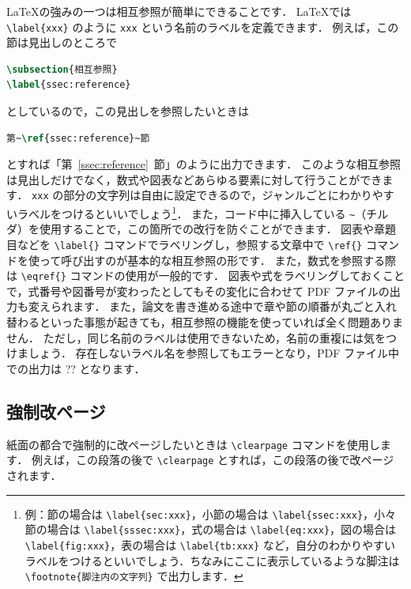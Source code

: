 \documentclass[
    paper=a4paper,      %
    article,            %
    fontsize=11pt,      %
    jafontsize=11pt,    %
    head_space=25mm,    %
    foot_space=25mm,    %
    gutter=20mm,        %
    fore-edge=20mm      %
    ]{jlreq}            %
\begin{document}
\LaTeX の強みの一つは相互参照が簡単にできることです．
\LaTeX では \verb|\label{xxx}| のように \verb|xxx| という名前のラベルを定義できます．
例えば，この節は見出しのところで
\begin{lstlisting}[language=TeX]
\subsection{相互参照}
\label{ssec:reference}
\end{lstlisting}
としているので，この見出しを参照したいときは
\begin{lstlisting}[language=TeX]
第~\ref{ssec:reference}~節
\end{lstlisting}
とすれば「第~\ref{ssec:reference}~節」のように出力できます．
このような相互参照は見出しだけでなく，数式や図表などあらゆる要素に対して行うことができます．
\verb|xxx| の部分の文字列は自由に設定できるので，ジャンルごとにわかりやすいラベルをつけるといいでしょう\footnote{例：節の場合は \texttt{\textbackslash label\{sec:xxx\}}，小節の場合は \texttt{\textbackslash label\{ssec:xxx\}}，小々節の場合は \texttt{\textbackslash label\{sssec:xxx\}}，式の場合は \texttt{\textbackslash label\{eq:xxx\}}，図の場合は \texttt{\textbackslash label\{fig:xxx\}}，表の場合は \texttt{\textbackslash label\{tb:xxx\}} など，自分のわかりやすいラベルをつけるといいでしょう．ちなみにここに表示しているような脚注は \texttt{\textbackslash footnote\{脚注内の文字列\}} で出力します．}．
また，コード中に挿入している \verb|~|（チルダ）を使用することで，この箇所での改行を防ぐことができます．
図表や章題目などを \verb|\label{}| コマンドでラベリングし，参照する文章中で \verb|\ref{}| コマンドを使って呼び出すのが基本的な相互参照の形です．
また，数式を参照する際は \verb|\eqref{}| コマンドの使用が一般的です．
図表や式をラベリングしておくことで，式番号や図番号が変わったとしてもその変化に合わせて PDF ファイルの出力も変えられます．
また，論文を書き進める途中で章や節の順番が丸ごと入れ替わるといった事態が起きても，相互参照の機能を使っていれば全く問題ありません．
ただし，同じ名前のラベルは使用できないため，名前の重複には気をつけましょう．
存在しないラベル名を参照してもエラーとなり，PDF ファイル中での出力は ?? となります．

\subsection{強制改ページ}
\label{ssec:pagebreak}

紙面の都合で強制的に改ページしたいときは \verb|\clearpage| コマンドを使用します．
例えば，この段落の後で \verb|\clearpage| とすれば，この段落の後で改ページされます．
\end{document}

